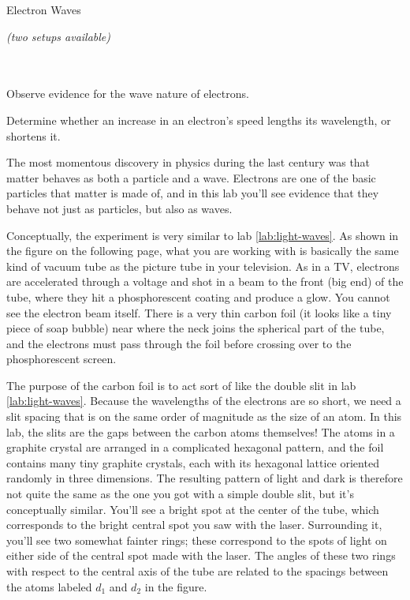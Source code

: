 \begin{lab}{Electron Waves}

\apparatus
\emph{(two setups available)}\\
\\
\\

\begin{goals}

\item[] Observe evidence for the wave nature of electrons.

\item[] Determine whether an increase in an electron's speed
lengths its wavelength, or shortens it.

\end{goals}

The most momentous discovery in physics during the last century was
that matter behaves as both a particle and a wave. Electrons are one
of the basic particles that matter is made of, and in this lab you'll
see evidence that they behave not just as particles, but also as waves.


Conceptually, the experiment is very similar to lab \ref{lab:light-waves}.
As shown in the figure on the following page, what you are working with is basically the same kind of
vacuum tube as the picture tube in your television. As in a
TV, electrons are accelerated through a voltage and shot in
a beam to the front (big end) of the tube, where they hit a
phosphorescent coating and produce a glow. You cannot see
the electron beam itself. There is a very thin carbon foil
(it looks like a tiny piece of soap bubble) near where the
neck joins the spherical part of the tube, and the electrons
must pass through the foil before crossing over to the
phosphorescent screen.

The purpose of the carbon foil is to act sort of like the double slit
in lab  \ref{lab:light-waves}. Because the wavelengths of the electrons
are so short, we need a slit spacing that is on the same order of
magnitude as the size of an atom. In this lab, the slits are the
gaps between the carbon atoms themselves! The atoms in a graphite
crystal are arranged in a complicated hexagonal pattern, and the foil
contains many tiny graphite crystals, each with its hexagonal lattice
oriented randomly in three dimensions.
The resulting pattern of light and dark is therefore not quite the same as the one
you got with a simple double slit, but it's conceptually similar.
You'll see a bright spot at the center of the tube, which corresponds
to the bright central spot you saw with the laser. Surrounding it, you'll
see two somewhat fainter rings; these correspond to the spots of light
on either side of the central spot made with the laser. The angles of these
two rings with respect to the central axis of the tube are related to
the spacings between the atoms labeled $d_1$ and $d_2$ in the figure.


\end{lab}
